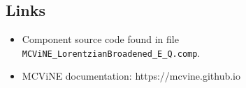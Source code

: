 \subsection*{Links}
\begin{itemize}
  \item Component source code found in file \texttt{MCViNE\_LorentzianBroadened\_E\_Q.comp}.
  \item MCViNE documentation: https://mcvine.github.io
\end{itemize}
